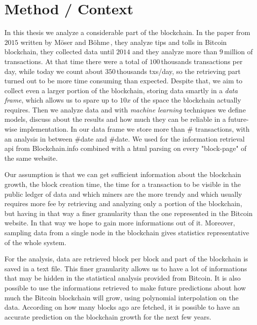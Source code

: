 \documentclass[USenglish]{uit-thesis}
\begin{document}



\section{Method / Context}
\label{sec:method}
In this thesis we analyze a considerable part of the blockchain.
In the paper from $2015$ written by Möser and Böhme\,\cite{Moser2015},
they analyze tips and tolls in Bitcoin blockchain, they collected data until $2014$
and they analyze more than $9$\,million of transactions.
At that time there were a total of $100$\,thousands
transactions per day, while today we count about $350$\,thousands
txs/day, so the retrieving part turned out to be more time consuming than expected.
Despite that, we aim to collect even
a larger portion of the blockchain, storing data smartly in a
\emph{data frame}, which allows us to spare
up to $10x$ of the space the blockchain actually requires. Then we analyze data
and with \emph{machine learning} techniques we define models, discuss about
the results and how much they can be reliable in a future-wise implementation.
In our data frame we store more than \# transactions, with an analysis in between
\#date and \#date.
We used for the information retrieval \gls{api} from Blockchain.info
combined with a \gls{html} parsing on every "block-page"
of the same website.

Our assumption is that we can get sufficient information about the
blockchain growth, the block creation time, the time for a transaction to be visible
in the public ledger of data and which miners are the more trendy and
which usually requires more fee by retrieving and analyzing only a portion
of the blockchain, but having in that way a finer
granularity than the one represented in the Bitcoin website. In that
way we hope to gain more informations out of it.
Moreover, sampling data from a single node in the blockchain gives statistics
representative of the whole system.

For the analysis, data are retrieved block per block and part of the blockchain
is saved in a text file. This finer granularity allows us to have
a lot of informations that may be hidden in the statistical analysis
provided from Bitcoin. It is also possible to use the informations retrieved
to make future predictions about how much the 
Bitcoin blockchain will grow, using polynomial interpolation on the data. According
on how many blocks ago are fetched, it is possible to have an accurate prediction
on the blockchain growth for the next few years.
\end{document}
